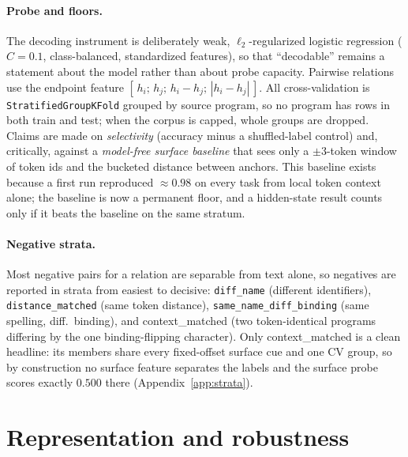 \documentclass[10pt]{article}
\newcommand{\cm}{\textsf{context\_matched}}
\newcommand{\code}[1]{\texttt{#1}}
\begin{document}
\paragraph{Probe and floors.} The decoding instrument is deliberately weak, 
$\ell_2$-regularized logistic regression ($C{=}0.1$, class-balanced,
standardized features), so that ``decodable'' remains a statement about the
model rather than about probe capacity. Pairwise relations use the endpoint
feature $[\,h_i;\,h_j;\,h_i{-}h_j;\,|h_i{-}h_j|\,]$. All cross-validation is
\code{Stratified\allowbreak GroupK\allowbreak Fold} grouped by source program, so no program has rows in
both train and test; when the corpus is capped, whole groups are dropped. Claims
are made on \emph{selectivity} (accuracy minus a shuffled-label control) and,
critically, against a \emph{model-free surface baseline} that sees only a
$\pm 3$-token window of token ids and the bucketed distance between anchors. This
baseline exists because a first run reproduced $\approx 0.98$ on every task from
local token context alone; the baseline is now a permanent floor, and a
hidden-state result counts only if it beats the baseline on the same stratum.

\paragraph{Negative strata.} Most negative pairs for a relation are separable
from text alone, so negatives are reported in strata from easiest to decisive:
\code{diff\_name} (different identifiers), \code{distance\_matched} (same token
distance), \code{same\allowbreak\_name\allowbreak\_diff\allowbreak\_binding} (same spelling, diff.\ binding),
and \cm{} (two token-identical programs differing by the one binding-flipping
character). Only \cm{} is a clean headline: its members share every fixed-offset
surface cue and one CV group, so by construction no surface feature separates the
labels and the surface probe scores exactly $0.500$ there
(Appendix~\ref{app:strata}).

\section{Representation and robustness}
\label{sec:repr}
\end{document}

